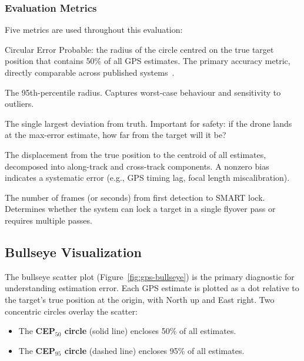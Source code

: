 \subsubsection{Evaluation Metrics}

Five metrics are used throughout this evaluation:

\begin{description}[leftmargin=2em, labelindent=0em]
  \item[CEP$_{50}$] Circular Error Probable: the radius of the circle centred on the true target position that contains 50\% of all GPS estimates.  The primary accuracy metric, directly comparable across published systems~\cite{barber2006vision, sambolek2025person}.
  \item[CEP$_{95}$] The 95th-percentile radius.  Captures worst-case behaviour and sensitivity to outliers.
  \item[Max error] The single largest deviation from truth.  Important for safety: if the drone lands at the max-error estimate, how far from the target will it be?
  \item[Bias vector] The displacement from the true position to the centroid of all estimates, decomposed into along-track and cross-track components.  A nonzero bias indicates a systematic error (e.g., GPS timing lag, focal length miscalibration).
  \item[Convergence time] The number of frames (or seconds) from first detection to SMART lock.  Determines whether the system can lock a target in a single flyover pass or requires multiple passes.
\end{description}

\subsection{Bullseye Visualization}\label{sec:bullseye-viz}

The bullseye scatter plot (Figure~\ref{fig:gps-bullseye}) is the primary diagnostic for understanding estimation error.  Each GPS estimate is plotted as a dot relative to the target's true position at the origin, with North up and East right.  Two concentric circles overlay the scatter:

\begin{itemize}
  \item The \textbf{CEP$_{50}$ circle} (solid line) encloses 50\% of all estimates.
  \item The \textbf{CEP$_{95}$ circle} (dashed line) encloses 95\% of all estimates.
\end{itemize}

